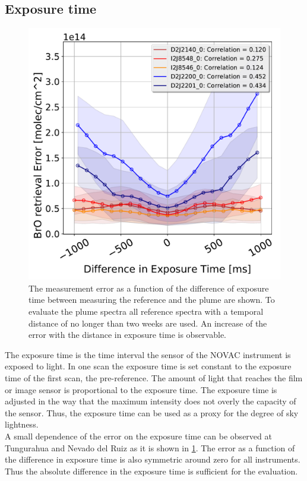 \subsection{Exposure time}
\begin{figure}
	\centering
	\includegraphics[width=0.7\linewidth]{Bilder/DiffExpTimeallInstruments}
	\caption[The   measurement error as a function of the difference of exposure time between recording the reference and the plume.]{The   measurement error as a function of the difference of exposure time between measuring the reference and the plume are shown. To evaluate the plume spectra all reference spectra with a temporal distance of no longer than two weeks are used. An increase of the  error with the distance in exposure time is observable.}
	\label{fig:diffexptime}
\end{figure}
The  exposure time is the time interval the sensor of the NOVAC instrument is exposed to light. In one scan the exposure time is set constant to the exposure time of the first scan, the pre-reference. The amount of light that reaches the film or image sensor is proportional to the exposure time. The exposure time is adjusted in the way that the maximum intensity does not overly the capacity of the sensor. Thus, the exposure time can be used as a proxy for the degree of sky lightness.\\
A small dependence of the  error on the exposure time can be observed at Tungurahua and Nevado del Ruiz as it is shown in \cref{fig:diffexptime}. The   error as a function of the difference in exposure time is also symmetric around zero for all instruments. Thus the absolute difference in the exposure time is sufficient for the evaluation.\\
